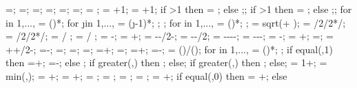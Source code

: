 {{\toparrlen=\toparrlen;
\basearrlen=\basearrlen;
\drift=\drift;
=;
=;
=;
\storyminone = ;
\columnnumber = \baynumber+1; %
\levelnumber = \storynumber+1; %
if \storynumber>1 then {\nlevmo = ;} else {;};
if \baynumber>1 then {\ncolmo = ;} else {;};
for \iii in {1,...,{\levelnumber}}{
\y{\iii} = ()*\storyheight;
for \j in {1,...,{\columnnumber}}{
\x{\j} = (\j-1)*\baywidth;
};
};
for \idefl in {1,...,{\levelnumber}}{
	 = ()*\drift;
};
\tempdim = sqrt( + );
\fixbeamx = \collinet/2/2*/\tempdim;
\fixbeamy = \collinet/2/2*/\tempdim;
 =  / \storyheight * \baywidth;
 =  / \storyheight * \baywidth;
\rigbasestartx = -\supportwidth;
\rigbaseendx = \x{\columnnumber}+\supportwidth;
\isoboty = -\supportheight-\baselinet/2-\isolationdepth;
\isotopy = -\supportheight-\baselinet/2;
\foundboty = -\supportheight-\baselinet-\isolationdepth-\foundationdepth;
\foundtopy = -\supportheight-\baselinet-\isolationdepth;
\foundstartx = -\foundsidew;
\foundendx = \x{\columnnumber}+\foundsidew;
\structheight=\storynumber*\storyheight;
\isomidy = \supportheight+\isolinet+\isolationdepth/2-\baselinet;
\basewallstartx=-\supportwidth;
\buildingwidth=\baynumber*\baywidth;
\basewalldepth=\subfloors*\storyheight;
\basewallstarty=\basewalldepth;
\basewallendx=\buildingwidth+\supportwidth;
\basewallendy=\basewallstarty;
\rightsoilx=\buildingwidth+\rightsoildist;
\rightsoily=\basewalldepth-\rightsoildepth;
\isospace = (\buildingwidth)/();
for \kiso in {1,...,{\numberofisolators}}{
\xiso{\kiso} = ()*\isospace;
};
if equal(\isoshiftyn,1) then
{=+\isoshift;
\xiso{\numberofisolators}=\xiso{\numberofisolators}-\isoshift;}
else {};
if greater(\doflocfloor,\storynumber) then {;} else{};
if greater(\dofloccolumn,\columnnumber) then {;} else{};
\dofloch = 1+\doflocfloor;
\minlen = min(\storyheight,\baywidth);
\dofxx = \x{\dofloccolumn}+\dofoffsetratio*\minlen;
\dofyy = \y{\dofloch}+\dofoffsetratio*\minlen;
\arrlen = \arrowlenratio*\minlen;
\arrrad = ;
\Xaxesstarty = ;
\Yaxesstartx = ;
\Yaxesstarty = \y{\levelnumber}+\axisseperation;
if equal(\showsupports,0) then
{\Xaxesstartx = \x{\columnnumber}+\axisseperation;} else
}}
